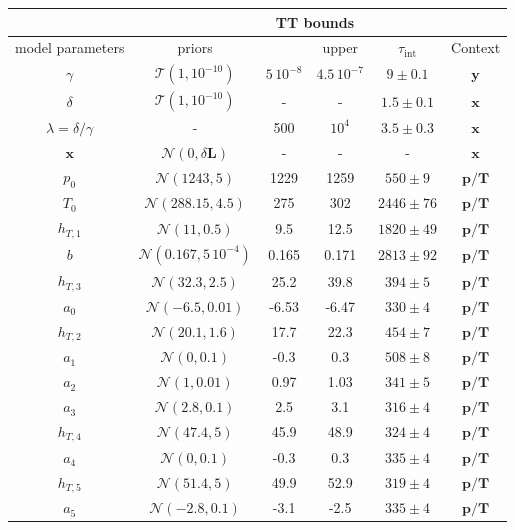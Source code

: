 \begin{table}
	\centering
	\begin{tabular}{ |c||c|c|c|c|c|   }
		\hline
		& &\multicolumn{2}{|c|}{TT bounds}& &\\
		\hline
		model parameters& priors&\makecell{lower}& \makecell{upper\\
		}&$\tau_{\text{int}}$&Context\\
		\hhline{|=||=|=|=|=|=|}
		$\gamma$ & $\mathcal{T}(1,10^{-10})$ &$5 \, 10^{-8}$ &$4.5 \, 10^{-7}$&  $ 9\pm 0.1$ &$\bm{y}$\\ \hline
		$\delta$ &$\mathcal{T}(1,10^{-10})$ & -&-& $1.5 \pm 0.1$ & $\bm{x}$\\ \hline
		$\lambda  = \delta / \gamma$ &- & 500&$10^4$& $3.5 \pm 0.3$ &$\bm{x}$\\ \hline
		$\bm{x}$ &$\mathcal{N}(0,\delta \bm{L})$ & -&-&-& $\bm{x}$\\ \hhline{|=||=|=|=|=|=|}
		$p_0$ &  $\mathcal{N}(1243,5)$&1229 &1259&$550 \pm 9$&$\bm{p/T}$\\ \hline
		$T_{0}$ &  $\mathcal{N}(288.15,4.5)$& 275 &302&$2446 \pm 76$&$\bm{p/T}$\\ \hline
		$h_{T,1}$ &  $\mathcal{N}(11,0.5)$&9.5 &12.5&$1820 \pm 49$ &$\bm{p/T}$\\ \hline
		$b$ &  $\mathcal{N}(0.167,5\,10^{-4})$& 0.165& 0.171 &$2813 \pm 92$&$\bm{p/T}$\\ \hline
		$h_{T,3}$ &  $\mathcal{N}(32.3,2.5)$&25.2&39.8&$394 \pm 5$&$\bm{p/T}$\\ \hline
		$a_{0}$ &  $\mathcal{N}(-6.5,0.01)$&-6.53 &-6.47&$330 \pm 4$&$\bm{p/T}$\\ \hline
		$h_{T,2}$ &  $\mathcal{N}(20.1,1.6)$&17.7 &22.3&$454 \pm 7$&$\bm{p/T}$\\ \hline
		$a_{1}$ &  $\mathcal{N}(0,0.1)$&-0.3 &0.3&$508 \pm 8$&$\bm{p/T}$\\ \hline
		$a_{2}$ &  $\mathcal{N}(1,0.01)$&0.97 &1.03&$341 \pm 5$&$\bm{p/T}$\\ \hline
		$a_{3}$ &  $\mathcal{N}(2.8,0.1)$&2.5 &3.1&$316 \pm 4$&$\bm{p/T}$\\ \hline
		$h_{T,4}$ &  $\mathcal{N}(47.4,5)$&45.9 &48.9&$324 \pm 4$&$\bm{p/T}$\\ \hline
		$a_{4}$ &  $\mathcal{N}(0,0.1)$&-0.3 &0.3&$335 \pm 4$&$\bm{p/T}$\\ \hline
		$h_{T,5}$ &  $\mathcal{N}(51.4,5)$&49.9 &52.9&$319 \pm 4$&$\bm{p/T}$\\ \hline
		$a_{5}$ &  $\mathcal{N}(-2.8,0.1)$&-3.1 &-2.5&$335 \pm 4$&$\bm{p/T}$\\ \hline

\end{tabular}
\end{table}
